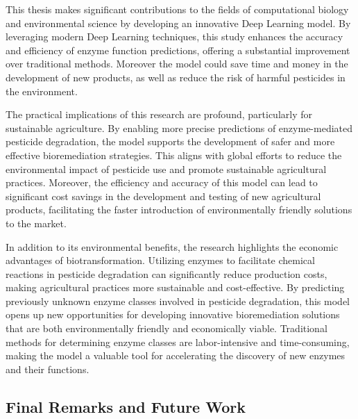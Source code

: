 This thesis makes significant contributions to the fields of computational biology and environmental science by developing an innovative Deep Learning model. By leveraging modern Deep Learning techniques, this study enhances the accuracy and efficiency of enzyme function predictions, offering a substantial improvement over traditional methods. Moreover the model could save time and money in the development of new products, as well as reduce the risk of harmful pesticides in the environment.

The practical implications of this research are profound, particularly for sustainable agriculture. By enabling more precise predictions of enzyme-mediated pesticide degradation, the model supports the development of safer and more effective bioremediation strategies. This aligns with global efforts to reduce the environmental impact of pesticide use and promote sustainable agricultural practices. Moreover, the efficiency and accuracy of this model can lead to significant cost savings in the development and testing of new agricultural products, facilitating the faster introduction of environmentally friendly solutions to the market.

In addition to its environmental benefits, the research highlights the economic advantages of biotransformation. Utilizing enzymes to facilitate chemical reactions in pesticide degradation can significantly reduce production costs, making agricultural practices more sustainable and cost-effective. By predicting previously unknown enzyme classes involved in pesticide degradation, this model opens up new opportunities for developing innovative bioremediation solutions that are both environmentally friendly and economically viable. Traditional methods for determining enzyme classes are labor-intensive and time-consuming, making the model a valuable tool for accelerating the discovery of new enzymes and their functions.

\subsection{Final Remarks and Future Work}
\label{sec:Final Remarks and Future Work}

